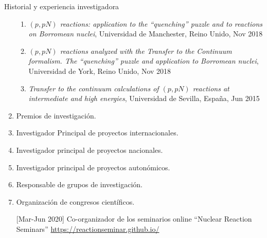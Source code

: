 \documentclass{resume2} %
\begin{document}
\begin{rSection}{Historial y experiencia investigadora}
\begin{enumerate}[label=\alph*.]
\begin{enumerate}[label=\arabic*.]
\item {\it $(p, pN )$ reactions: application to the “quenching” puzzle and to
reactions on Borromean nuclei}, Universidad de Manchester, Reino Unido, Nov 2018

\item {\it $(p, pN )$ reactions analyzed with the Transfer to the Continuum
formalism. The “quenching” puzzle and application to Borromean
nuclei}, Universidad de York, Reino Unido, Nov 2018


\item {\it Transfer to the continuum calculations of $(p,pN)$ reactions at intermediate and high energies}, Universidad de Sevilla, Espa\~na, Jun 2015

\end{enumerate}


\item Premios de investigación.

\item Investigador Principal de proyectos internacionales.

\item  Investigador principal de proyectos nacionales.

\item Investigador principal de proyectos autonómicos.

\item Responsable de grupos de investigación.

\item Organización de congresos científicos.

[Mar-Jun 2020] Co-organizador de los seminarios online ``Nuclear Reaction Seminars'' \url{https://reactionseminar.github.io/}

\end{enumerate}
\end{rSection}
\end{document}
